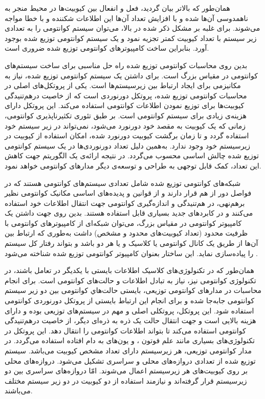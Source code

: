 همان‌طور که بالاتر بیان گردید، فعل و انفعال بین کیوبیت‌ها در محیط منجر به ناهمدوسی آن‌ها شده و با افزایش تعداد آن‌ها این اطلاعات شکننده و با خطا مواجه می‌شوند\cite{krojanski2004scaling}. برای غلبه بر مشکل ذکر شده در بالا، می‌توان سیستم کوانتومی را به تعدادی زیر سیستم با تعداد کیوبیت کمتر تجزیه نمود و یک سیستم کوانتومی توزیع شده بوجود آورد. بنابراین ساخت کامپیوتر‌های کوانتومی توزیع شده ضروری است\cite{van2010}.

بدین روی محاسبات کوانتومی توزیع شده راه حل مناسبی برای ساخت سیستم‌های کوانتومی در مقیاس بزرگ است. برای داشتن یک سیستم کوانتومی توزیع شده، نیاز به مکانیزمی برای ایجاد ارتباط بین زیر‌سیستم‌ها است. یکی از پروتکل‌های اصلی در محاسبات کوانتومی توزیع شده، پروتکل دورنوردی است که از خاصیت در‌هم‌تنیدگی کیوبیت‌ها برای توزیع نمودن اطلاعات کوانتومی استفاده می‌کند. این پروتکل دارای هزینه‌ی زیادی برای سیستم کوانتومی است. بر طبق تئوری تکثیرناپذیری کوانتومی، زمانی که یک کیوبیت به مقصد خود دورنورد می‌شود، نمی‌تواند در زیر سیستم خود استفاده گردد و تا زمان برگشت کیوبیت دورنورد شده، امکان استفاده از کیوبیت در زیرسیستم خود وجود ندارد. به‌همین دلیل تعداد دورنوردی‌ها در یک سیستم کوانتومی توزیع شده چالش اساسی محسوب می‌گردد. در نتیجه ارائه‌ی یک الگوریتم جهت کاهش این تعداد، کمک قابل توجهی به طراحی و توسعه‌ی دیگر مدارهای کوانتومی خواهد نمود.

شبکه‌های کوانتومی توزیع شده شامل تعدادی سیستم‌های کوانتومی هستند که در فواصل دور از هم قرار دارند و از قوانین و پدیده‌های اساسی مکانیک کوانتومی نظیر برهم‌نهی، در هم‌تنیدگی و اندازه‌گیری کوانتومی جهت انتقال اطلاعات خود استفاده می‌کنند و در کابردهای جدید بسیاری قابل استفاده هستند\cite{loncar2019development}. 
بدین روی جهت داشتن یک کامپیوتر کوانتومی در مقیاس بزرگ، می‌توان شبکه‌ای از کامپیوترهای کوانتومی با ظرفیت محدود (تعداد کیوبیت‌های محدود و مشخص) داشت به‌طوری که ارتباط بین آن‌ها از طریق یک کانال کوانتومی یا کلاسیک و یا هر دو باشد و بتواند رفتار کل سیستم را پیاده‌سازی نماید. این ساختار بعنوان کامپیوتر کوانتومی توزیع شده شناخته می‌شود
\cite{nickerson2013topological}.

 همان‌طور که در تکنولوژی‌های کلاسیک اطلاعات بایستی با یکدیگر در تعامل باشند، در تکنولوژی کوانتومی نیز، نیاز به تبادل اطلاعات و حالت‌های کوانتومی است. برای انجام محاسبات در مدارهای کوانتومی توزیعی، بایستی حالت‌هاي کوانتومی بین دو زیر سیستم کوانتومی جابه‌جا شده و برای انجام این ارتباط بایستی از پروتکل دورنوردی کوانتومی استفاده شود\cite{Bennett}. این پروتکل، پروتکلی اصلی و مهم در سیستم‌های توزیعی بوده و دارای هزینه بالایی است و جهت انتقال حالت یک ذره به ذره‌ای دیگر، از خاصیت درهم‌تنیدگی کوانتومی استفاده می‌کند\cite{Whit} تا بتواند اطلاعات کوانتومی را انتقال دهد. این پروتکل در تکنولوژی‌های بسیاری مانند علم فوتون \cite{bouwmeester1997}،  \cite{Nielsen1998} و یون‌های به دام افتاده\cite{Riebe2004}   استفاده می‌گردد. در مدار کوانتومی توزیعی، هر زیرسیستم دارای تعداد مشخص کیوبیت می‌باشد. سیستم توزیع شده از تعدادی دروازه‌های محلی و سراسری تشکیل می‌شود. دروازه‌های محلی بر روی کیوبیت‌های هر زیرسیستم اعمال می‌شوند. امّا دروازه‌های سراسری بین دو زیرسیستم قرار گرفته‌اند و نیازمند استفاده از دو کیوبیت در دو زیر سیستم مختلف می‌باشند. 


